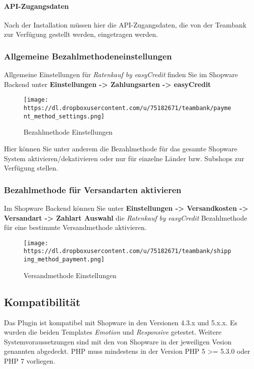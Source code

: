 \paragraph{API-Zugangsdaten}\label{api-zugangsdaten}

Nach der Installation müssen hier die API-Zugangsdaten, die von der
Teambank zur Verfügung gestellt werden, eingetragen werden.

\subsubsection{Allgemeine
Bezahlmethodeneinstellungen}\label{allgemeine-bezahlmethodeneinstellungen}

Allgemeine Einstellungen für \emph{Ratenkauf by easyCredit} finden Sie
im Shopware Backend unter \textbf{Einstellungen -\textgreater{}
Zahlungsarten -\textgreater{} easyCredit}

\begin{figure}[htbp]
\centering
\texttt{[image: https://dl.dropboxusercontent.com/u/75182671/teambank/payment\_method\_settings.png]}
\caption{Bezahlmethode Einstellungen}
\end{figure}

Hier können Sie unter anderem die Bezahlmethode für das gesamte Shopware
System aktivieren/dekativieren oder nur für einzelne Länder bzw.
Subshops zur Verfügung stellen.

\subsubsection{Bezahlmethode für Versandarten
aktivieren}\label{bezahlmethode-fuxfcr-versandarten-aktivieren}

Im Shopware Backend können Sie unter \textbf{Einstellungen
-\textgreater{} Versandkosten -\textgreater{} Versandart -\textgreater{}
Zahlart Auswahl} die \emph{Ratenkauf by easyCredit} Bezahlmethode für
eine bestimmte Versandmethode aktivieren.

\begin{figure}[htbp]
\centering
\texttt{[image: https://dl.dropboxusercontent.com/u/75182671/teambank/shipping\_method\_payment.png]}
\caption{Versandmethode Einstellungen}
\end{figure}

\subsection{Kompatibilität}\label{kompatibilituxe4t}

Das Plugin ist kompatibel mit Shopware in den Versionen 4.3.x und 5.x.x.
Es wurden die beiden Templates \emph{Emotion} und \emph{Responsive}
getestet. Weitere Systemvoraussetzungen sind mit den von Shopware in der
jeweiligen Vesion genannten abgedeckt.
PHP muss mindestens in der Version PHP 5 >= 5.3.0 oder PHP 7 vorliegen.
